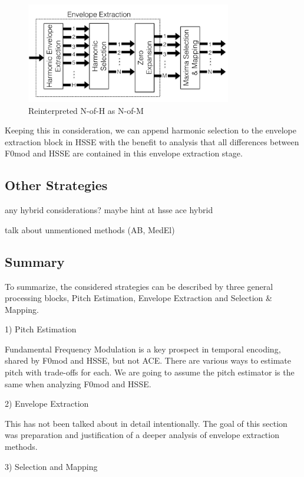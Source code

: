 \documentclass [11pt, proquest] {uwthesis}[2015/03/03]
\begin{document}
\begin{figure}[!ht]
  \centering
    \includegraphics[width=0.8\textwidth]{HSSE_selection_newTEMP}   
    \caption{Reinterpreted N-of-H as N-of-M}
\end{figure}

Keeping this in consideration, we can append harmonic selection to the envelope extraction block in HSSE with the benefit to analysis that all differences between F0mod and HSSE are contained in this envelope extraction stage.


\subsection{Other Strategies}

any hybrid considerations?  maybe hint at hsse ace hybrid

talk about unmentioned methods (AB, MedEl)

\subsection{Summary}

To summarize, the considered strategies can be described by three general processing blocks, Pitch Estimation, Envelope Extraction and Selection \& Mapping.

1) Pitch Estimation

Fundamental Frequency Modulation is a key prospect in temporal encoding, shared by F0mod and HSSE, but not ACE.  There are various ways to estimate pitch with trade-offs for each.  We are going to assume the pitch estimator is the same when analyzing F0mod and HSSE.

2) Envelope Extraction

This has not been talked about in detail intentionally.  The goal of this section was preparation and justification of a deeper analysis of envelope extraction methods.

3) Selection and Mapping
\end{document}
